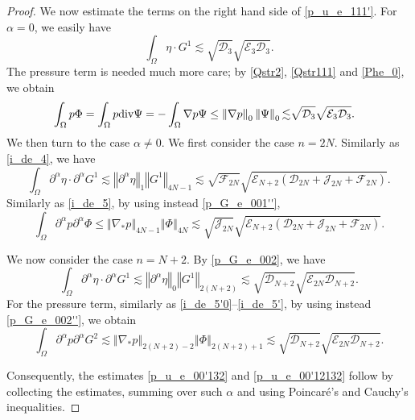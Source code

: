\documentclass[a4paper,reqno,11pt]{amsart}
\numberwithin{equation}{section}
\providecommand{\norm}[1]{\left\Vert#1\right\Vert}
\providecommand{\sd}[1]{\mathcal{D}_{#1}}
\providecommand{\se}[1]{\mathcal{E}_{#1}}
\providecommand{\norm}[1]{\left\Vert#1\right\Vert}
\begin{document}
\begin{proof}
We now estimate the terms on the right hand side of \eqref{p_u_e_111'}. For ${\alpha}=0$, we easily have
\begin{equation}
   \int_\Omega  \eta  \cdot   G^1
    {\lesssim} \sqrt{ \sd{3} } \sqrt{ \se{3}\sd{3}  } .
\end{equation}
The pressure term is needed much more care; by \eqref{Qstr2}, \eqref{Qstr111} and \eqref{Phe_0}, we obtain
\begin{equation}
\begin{split}
 & \int_\Omega     p   \Phi= \int_\Omega     p   {\rm div}\Psi= -\int_\Omega  \nabla  p   \Psi\le \norm{\nabla p}_0\norm{\Psi}_0{\lesssim} \sqrt{ \sd{3} } \sqrt{ \se{3}\sd{3}  } .
\end{split}
\end{equation}
We then turn to the case ${\alpha}\neq 0$. We first consider the case $n=2N$. Similarly as \eqref{i_de_4},  we have
\begin{equation}
\int_\Omega   {\partial}^{\alpha} \eta \cdot  {\partial}^{\alpha} G^1    {\lesssim}  \norm{{\partial}^{\alpha}  \eta}_{1}  \norm{   G^1 }_{4N-1}
 {\lesssim} \sqrt{\mathcal{F}_{2N}} \sqrt{ \se{N+2}(\sd{2N}+\mathcal{J}_{2N} +{\mathcal{F}_{2N}})  }.
\end{equation}
Similarly as \eqref{i_de_5}, by using instead \eqref{p_G_e_001''},
\begin{equation}
  \int_\Omega  {\partial}^{\alpha} p {\partial}^{\alpha} \Phi
\le \norm{\nabla_\ast p}_{4N-1}  \norm{    \Phi }_{4N}
 {\lesssim} \sqrt{ \mathcal{J}_{2N} }\sqrt{ \se{N+2}(\sd{2N}+\mathcal{J}_{2N} +{\mathcal{F}_{2N}})  } .
\end{equation}

We now consider the case $n=N+2$. By \eqref{p_G_e_002}, we have
\begin{equation}
\int_\Omega   {\partial}^{\alpha} \eta \cdot  {\partial}^{\alpha} G^1    {\lesssim}  \norm{{\partial}^{\alpha}  \eta}_{0}  \norm{   G^1 }_{2(N+2)}
 {\lesssim} \sqrt{ \sd{N+2}} \sqrt{ \se{2N}\sd{N+2} }.
\end{equation}
For the pressure term, similarly as \eqref{i_de_5'0}--\eqref{i_de_5'}, by using instead \eqref{p_G_e_002''}, we obtain
\begin{equation}
  \int_\Omega  {\partial}^{\alpha} p {\partial}^{\alpha} G^2
{\lesssim} \norm{ \nabla_\ast p}_{2(N+2)-2}  \norm{\Phi }_{2(N+2)+1}
 {\lesssim} \sqrt{ \sd{N+2} }\sqrt{ \se{2N}\sd{N+2}}  .
\end{equation}

Consequently, the estimates \eqref{p_u_e_00'132} and \eqref{p_u_e_00'12132} follow by collecting the estimates, summing over such $\alpha$ and using Poincar\'e's and Cauchy's inequalities.
\end{proof}
\end{document}
